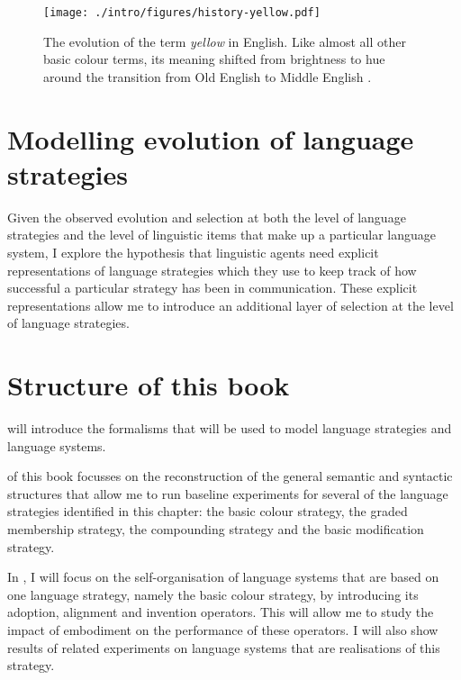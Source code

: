 \begin{figure}
  \begin{center}
   \texttt{[image: ./intro/figures/history-yellow.pdf]}\\[-1\baselineskip]
   \caption[The evolution of the term \textit{yellow} in English]{The
     evolution of the term \textit{yellow} in English. Like almost all
     other basic colour terms, its meaning shifted from brightness to
     hue around the transition from Old English to Middle
     English \citep{casson97shift}.}
    \label{f:history-yellow}
  \end{center}
\end{figure}

\section{Modelling evolution of language strategies}

Given the observed evolution and selection at both the level of
language strategies and the level of linguistic items that make up a
particular language system, I explore the hypothesis that linguistic
agents need explicit representations of language strategies which they
use to keep track of how successful a particular strategy has been in
communication. These explicit representations allow me to introduce an
additional layer of selection at the level of language strategies.

\section{Structure of this book}

 will introduce the formalisms that will be 
used to model language strategies and language systems.

 of this book focusses on the
reconstruction of the general semantic and syntactic structures that
allow me to run baseline experiments for several of the language
strategies identified in this chapter: the basic colour strategy, the
graded membership strategy, the compounding strategy and the
basic modification strategy.

In , I will focus on the
self-organisation of language systems that are based on one language strategy,
namely the basic colour strategy, by introducing its adoption,
alignment and invention operators. This will allow me to study the
impact of embodiment on the performance of these operators. I will
also show results of related experiments on language systems that are
realisations of this strategy.

